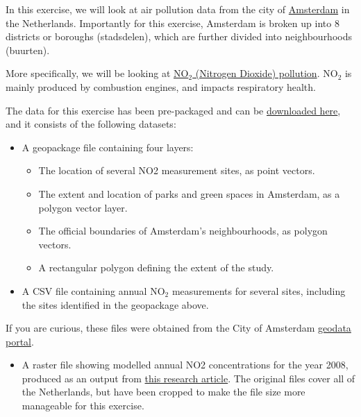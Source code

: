\documentclass[
  letterpaper,
  DIV=11,
  numbers=noendperiod]{scrreprt}
\providecommand{\tightlist}{%
  \setlength{\itemsep}{0pt}\setlength{\parskip}{0pt}}\usepackage{longtable,booktabs,array}
\begin{document}
In this exercise, we will look at air pollution data from the city of
\href{https://en.wikipedia.org/wiki/Amsterdam}{Amsterdam} in the
Netherlands. Importantly for this exercise, Amsterdam is broken up into
8 districts or boroughs (stadsdelen), which are further divided into
neighbourhoods (buurten).

More specifically, we will be looking at
\href{https://www.gov.uk/government/statistics/air-quality-statistics/ntrogen-dioxide}{NO\(_2\)
(Nitrogen Dioxide) pollution}. NO\(_2\) is mainly produced by combustion
engines, and impacts respiratory health.

The data for this exercise has been pre-packaged and can be
\href{https://stir-my.sharepoint.com/:u:/g/personal/ala2_stir_ac_uk/ESlllBAgUyBJqNE2dGCSKkoBPKZlxKg-mTw8hjSkG0fpVA?e=Qg4Psg}{downloaded
here}, and it consists of the following datasets:

\begin{itemize}
\tightlist
\item
  A geopackage file containing four layers:

  \begin{itemize}
  \tightlist
  \item
    The location of several NO2 measurement sites, as point vectors.
  \item
    The extent and location of parks and green spaces in Amsterdam, as a
    polygon vector layer.
  \item
    The official boundaries of Amsterdam's neighbourhoods, as polygon
    vectors.
  \item
    A rectangular polygon defining the extent of the study.
  \end{itemize}
\item
  A CSV file containing annual NO\(_2\) measurements for several sites,
  including the sites identified in the geopackage above.
\end{itemize}

If you are curious, these files were obtained from the City of Amsterdam
\href{https://maps.amsterdam.nl/open_geodata/}{geodata portal}.

\begin{itemize}
\tightlist
\item
  A raster file showing modelled annual NO2 concentrations for the year
  2008, produced as an output from
  \href{https://www.nature.com/articles/sdata201935}{this research
  article}. The original files cover all of the Netherlands, but have
  been cropped to make the file size more manageable for this exercise.
\end{itemize}
\end{document}
